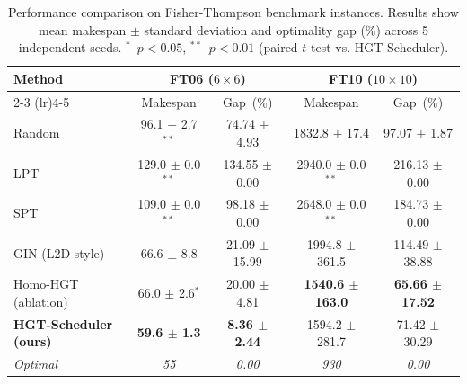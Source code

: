 \begin{table}[t]
  \centering
  \small
  \caption{%
    Performance comparison on Fisher-Thompson benchmark instances.
    Results show mean makespan $\pm$ standard deviation and
    optimality gap (\%) across 5 independent seeds.
    $^*$~$p<0.05$, $^{**}$~$p<0.01$ (paired $t$-test vs.
    HGT-Scheduler).
  }
  \label{tab:main_results}
  \begin{tabular}{lcccc}
    \toprule
    Method & \multicolumn{2}{c}{FT06 ($6\times6$)} & \multicolumn{2}{c}{FT10 ($10\times10$)} \\
    \cmidrule(lr){2-3} \cmidrule(lr){4-5}
    & Makespan & Gap~(\%) & Makespan & Gap~(\%) \\
    \midrule
    Random & 96.1 $\pm$ 2.7$^{**}$ & 74.74 $\pm$ 4.93 & 1832.8 $\pm$ 17.4 & 97.07 $\pm$ 1.87 \\
    LPT & 129.0 $\pm$ 0.0$^{**}$ & 134.55 $\pm$ 0.00 & 2940.0 $\pm$ 0.0$^{**}$ & 216.13 $\pm$ 0.00 \\
    SPT & 109.0 $\pm$ 0.0$^{**}$ & 98.18 $\pm$ 0.00 & 2648.0 $\pm$ 0.0$^{**}$ & 184.73 $\pm$ 0.00 \\
    GIN (L2D-style)~\cite{zhang2020learning} & 66.6 $\pm$ 8.8 & 21.09 $\pm$ 15.99 & 1994.8 $\pm$ 361.5 & 114.49 $\pm$ 38.88 \\
    Homo-HGT (ablation) & 66.0 $\pm$ 2.6$^{*}$ & 20.00 $\pm$ 4.81 & \textbf{1540.6 $\pm$ 163.0} & \textbf{65.66 $\pm$ 17.52} \\
    \midrule
    \textbf{HGT-Scheduler (ours)} & \textbf{59.6 $\pm$ 1.3} & \textbf{8.36 $\pm$ 2.44} & 1594.2 $\pm$ 281.7 & 71.42 $\pm$ 30.29 \\
    \midrule
    \textit{Optimal} & \textit{55} & \textit{0.00} & \textit{930} & \textit{0.00} \\
    \bottomrule
  \end{tabular}
\end{table}